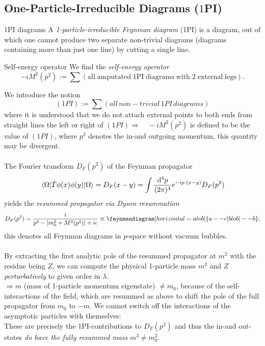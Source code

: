 \subsection{One-Particle-Irreducible Diagrams   ($1$PI)}
\begin{mybox}{$1$PI diagrams}
	A \emph{1-particle-irreducible Feynman diagram} (1PI) is a diagram, out of which one cannot produce two separate non-trivial diagrams (diagrams containing more than just one line) by cutting a single line.
\end{mybox}
\begin{mybox}{Self-energy operator}
	We find the \emph{self-energy operator}
	 \begin{equation}
	 	\label{eq:selfenergyoperator}
	 	-iM^2(p^2):= \sum \left(\mathrm{all\;amputated\; 1PI\;diagrams\;with\;2\;external\;legs}\right).
	 \end{equation}
\end{mybox}
We introduce the notion
\begin{equation}
	(1PI) := \sum(all\, non-trivial\, 1PI\, diagrams)
\end{equation}
where it is understood that we do not attach external points to both ends from straight lines the left or right of $(1PI) \Rightarrow \quad -i M^2(p^2)$ is defined to be the value of $(1PI)$, where $p^2$ denotes the in-and outgoing momentum, this quantity may be divergent.\\
\\
The Fourier transform $D_F(p^2)$ of the Feynman propagator 
\begin{equation}
	\expval{\hat{T}\phi(x)  \phi(y)}{\Omega} = D_F(x-y) = \int \frac{\mathrm{d}^4 p}{(2\pi)^4} e^{- i p \cdot (x-y)} D_F(p^2)
\end{equation}
yields the \emph{resummed propagator via Dyson resummation}
\begin{equation}
\label{eq:propagatorDysonresummed}
	D_F(p^2) = \frac{i}{p^2 - [m^2_0 + M^2(p^2)] + i \epsilon} \equiv
	 \feynmandiagram [horizontal=a to b] {a -- c [blob]--b};
\end{equation}
this denotes all Feynman diagrams in $p$-space without vacuum bubbles.\\
\\
By extracting the first analytic pole of the resummed propagator at $m^2$ with the residue being $Z$, we can compute the physical 1-particle mass $m^2$ and $Z$ \emph{perturbatively} to given order in $\lambda$.\\
$\Rightarrow m$ (mass of 1-particle momentum eigenstate) $\neq m_0$, because of the self-interactions of the field, which are resummed as above to shift the pole of the full propagator from $m_0$ to $-m$. We cannot switch off the interactions of the asymptotic particles with themselves:\\
These are precisely the 1PI-contributions to $D_F(p^2)$ and thus the in-and out-states  \emph{do have the fully resummed mass} $m^2\neq m^2_0$.
